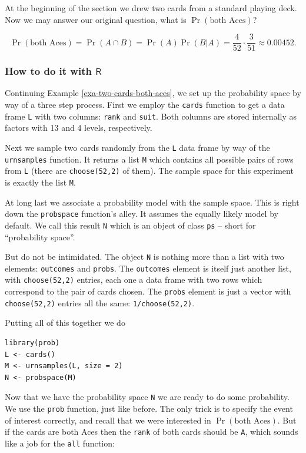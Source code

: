 \documentclass[captions=tableheading]{scrbook}
\begin{document}
\begin{example}
At the beginning of the section we drew two cards from a standard playing deck. Now we may answer our original question, what is \(\Pr(\mbox{both Aces})\)?

\[
\Pr(\mbox{both Aces})=\Pr(A\cap B)=\Pr(A)\Pr(B|A)=\frac{4}{52}\cdot\frac{3}{51}\approx0.00452.
\]

\end{example}
\subsubsection{How to do it with \(\mathsf{R}\)}
\label{sec-4-6-2-1}
\label{sub-howto-ps-objects}


Continuing Example \ref{exa-two-cards-both-aces}, we set up the probability space by way of a three step process. First we employ the \texttt{cards} function to get a data frame \texttt{L} with two columns: \texttt{rank} and \texttt{suit}. Both columns are stored internally as factors with 13 and 4 levels, respectively.

Next we sample two cards randomly from the \texttt{L} data frame by way of the \texttt{urnsamples} function. It returns a list \texttt{M} which contains all possible pairs of rows from \texttt{L} (there are \texttt{choose(52,2)} of them). The sample space for this experiment is exactly the list \texttt{M}.

At long last we associate a probability model with the sample space. This is right down the \texttt{probspace} function's alley. It assumes the equally likely model by default. We call this result \texttt{N} which is an object of class \texttt{ps} -- short for ``probability space''.

But do not be intimidated. The object \texttt{N} is nothing more than a list with two elements: \texttt{outcomes} and \texttt{probs}. The \texttt{outcomes} element is itself just another list, with \texttt{choose(52,2)} entries, each one a data frame with two rows which correspond to the pair of cards chosen. The \texttt{probs} element is just a vector with \texttt{choose(52,2)} entries all the same: \texttt{1/choose(52,2)}.

Putting all of this together we do 


\begin{verbatim}
library(prob)
L <- cards()
M <- urnsamples(L, size = 2)
N <- probspace(M)
\end{verbatim}

Now that we have the probability space \texttt{N} we are ready to do some probability. We use the \texttt{prob} function, just like before. The only trick is to specify the event of interest correctly, and recall that we were interested in \(\Pr(\mbox{both Aces})\). But if the cards are both Aces then the \texttt{rank} of both cards should be \texttt{A}, which sounds like a job for the \texttt{all} function:
\end{document}
